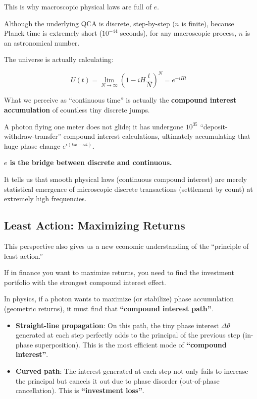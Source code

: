 This is why macroscopic physical laws are full of $e$.

Although the underlying QCA is discrete, step-by-step ($n$ is finite), because Planck time is extremely short ($10^{-44}$ seconds), for any macroscopic process, $n$ is an astronomical number.

The universe is actually calculating:

$$U(t) = \lim_{N \to \infty} \left(1 - i H \frac{t}{N}\right)^N = e^{-iHt}$$

What we perceive as ``continuous time'' is actually the \textbf{compound interest accumulation} of countless tiny discrete jumps.

A photon flying one meter does not glide; it has undergone $10^{35}$ ``deposit-withdraw-transfer'' compound interest calculations, ultimately accumulating that huge phase change $e^{i(kx-\omega t)}$.

\textbf{$e$ is the bridge between discrete and continuous.}

It tells us that smooth physical laws (continuous compound interest) are merely statistical emergence of microscopic discrete transactions (settlement by count) at extremely high frequencies.

\subsection{Least Action: Maximizing Returns}

This perspective also gives us a new economic understanding of the ``principle of least action.''

If in finance you want to maximize returns, you need to find the investment portfolio with the strongest compound interest effect.

In physics, if a photon wants to maximize (or stabilize) phase accumulation (geometric returns), it must find that \textbf{``compound interest path''}.

\begin{itemize}
\item \textbf{Straight-line propagation}: On this path, the tiny phase interest $\Delta \theta$ generated at each step perfectly adds to the principal of the previous step (in-phase superposition). This is the most efficient mode of \textbf{``compound interest''}.

\item \textbf{Curved path}: The interest generated at each step not only fails to increase the principal but cancels it out due to phase disorder (out-of-phase cancellation). This is \textbf{``investment loss''}.
\end{itemize}

